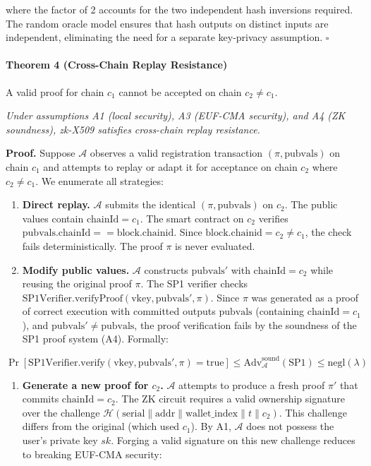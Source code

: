 \documentclass[11pt, a4paper]{article}
\providecommand{\tightlist}{%
  \setlength{\itemsep}{0pt}\setlength{\parskip}{0pt}}
\begin{document}
where the factor of 2 accounts for the two independent hash inversions
required. The random oracle model ensures that hash outputs on distinct
inputs are independent, eliminating the need for a separate key-privacy
assumption. \(\square\)

\paragraph{Theorem 4 (Cross-Chain Replay Resistance)}\label{theorem-4-cross-chain-replay-resistance} A valid proof for
chain \(c_1\) cannot be accepted on chain \(c_2 \neq c_1\).

\emph{Under assumptions A1 (local security), A3 (EUF-CMA security), and
A4 (ZK soundness), zk-X509 satisfies cross-chain replay resistance.}

\textbf{Proof.} Suppose \(\mathcal{A}\) observes a valid registration
transaction \((\pi, \text{pubvals})\) on chain \(c_1\) and attempts to
replay or adapt it for acceptance on chain \(c_2\) where
\(c_2 \neq c_1\). We enumerate all strategies:

\begin{enumerate}
\def\labelenumi{(\alph{enumi})}
\item
  \textbf{Direct replay.} \(\mathcal{A}\) submits the identical
  \((\pi, \text{pubvals})\) on \(c_2\). The public values contain
  \(\text{chainId} = c_1\). The smart contract on \(c_2\) verifies
  \(\text{pubvals.chainId} == \text{block.chainid}\). Since
  \(\text{block.chainid} = c_2 \neq c_1\), the check fails
  deterministically. The proof \(\pi\) is never evaluated.
\item
  \textbf{Modify public values.} \(\mathcal{A}\) constructs
  \(\text{pubvals}'\) with \(\text{chainId} = c_2\) while reusing the
  original proof \(\pi\). The SP1 verifier checks
  \(\text{SP1Verifier.verifyProof}(\text{vkey}, \text{pubvals}', \pi)\).
  Since \(\pi\) was generated as a proof of correct execution with
  committed outputs \(\text{pubvals}\) (containing
  \(\text{chainId} = c_1\)), and
  \(\text{pubvals}' \neq \text{pubvals}\), the proof verification fails
  by the soundness of the SP1 proof system (A4). Formally:
\end{enumerate}

\[\Pr[\text{SP1Verifier.verify}(\text{vkey}, \text{pubvals}', \pi) = \text{true}] \leq \text{Adv}_{\mathcal{A}}^{\text{sound}}(\text{SP1}) \leq \text{negl}(\lambda)\]

\begin{enumerate}
\def\labelenumi{(\alph{enumi})}
\setcounter{enumi}{2}
\tightlist
\item
  \textbf{Generate a new proof for \(c_2\).} \(\mathcal{A}\) attempts to
  produce a fresh proof \(\pi'\) that commits \(\text{chainId} = c_2\).
  The ZK circuit requires a valid ownership signature over the challenge
  \(\mathcal{H}(\text{serial} \| \text{addr} \| \text{wallet\_index} \| t \| c_2)\).
  This challenge differs from the original (which used \(c_1\)). By A1,
  \(\mathcal{A}\) does not possess the user's private key \(sk\).
  Forging a valid signature on this new challenge reduces to breaking
  EUF-CMA security:
\end{enumerate}
\end{document}
